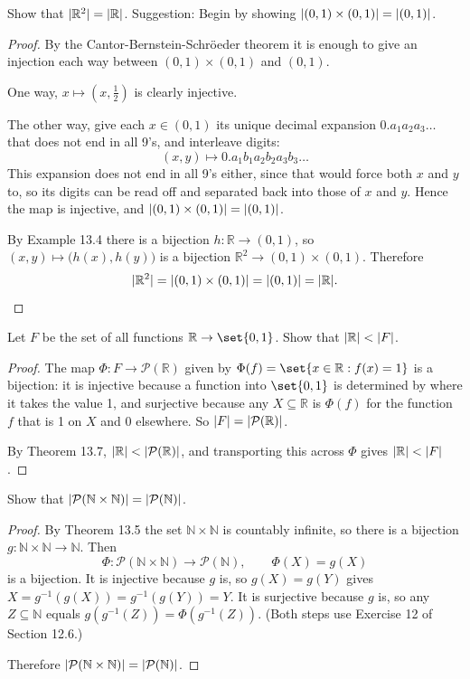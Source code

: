 \documentclass[DIN, pagenumber=false, fontsize=11pt, parskip=half]{scrartcl}
\begin{document}
\begin{problems}
    \problem Show that $\lvert \mathbb{R}^2 \rvert = \lvert \mathbb{R} \rvert$. Suggestion: Begin by showing $\lvert (0,1) \times (0,1) \rvert = \lvert (0,1) \rvert$.

    \begin{proof}
        By the Cantor-Bernstein-Schr\"oeder theorem it is enough to give an injection each way between $(0,1) \times (0,1)$ and $(0,1)$.

        One way, $x \mapsto \left(x, \frac{1}{2}\right)$ is clearly injective.

        The other way, give each $x \in (0,1)$ its unique decimal expansion $0.a_1a_2a_3\ldots$ that does not end in all 9's, and interleave digits:
        \[
            (x,y) \longmapsto 0.a_1b_1a_2b_2a_3b_3\ldots
        \]
        This expansion does not end in all 9's either, since that would force both $x$ and $y$ to, so its digits can be read off and separated back into those of $x$ and $y$. Hence the map is injective, and $\lvert (0,1) \times (0,1) \rvert = \lvert (0,1) \rvert$.

        By Example 13.4 there is a bijection $h : \mathbb{R} \to (0,1)$, so $(x,y) \mapsto \big(h(x),h(y)\big)$ is a bijection $\mathbb{R}^2 \to (0,1) \times (0,1)$. Therefore
        \[
            \lvert \mathbb{R}^2 \rvert = \lvert (0,1) \times (0,1) \rvert = \lvert (0,1) \rvert = \lvert \mathbb{R} \rvert. \qedhere
        \]
    \end{proof}

    \problem Let $F$ be the set of all functions $\mathbb{R} \to \set{0,1}$. Show that $\lvert \mathbb{R} \rvert < \lvert F \rvert$.

    \begin{proof}
        The map $\Phi : F \to \mathcal{P}(\mathbb{R})$ given by $\Phi(f) = \set{x \in \mathbb{R} : f(x) = 1}$ is a bijection: it is injective because a function into $\set{0,1}$ is determined by where it takes the value 1, and surjective because any $X \subseteq \mathbb{R}$ is $\Phi(f)$ for the function $f$ that is 1 on $X$ and 0 elsewhere. So $\lvert F \rvert = \lvert \mathcal{P}(\mathbb{R}) \rvert$.

        By Theorem 13.7, $\lvert \mathbb{R} \rvert < \lvert \mathcal{P}(\mathbb{R}) \rvert$, and transporting this across $\Phi$ gives $\lvert \mathbb{R} \rvert < \lvert F \rvert$.
    \end{proof}

    \problem Show that $\lvert \mathcal{P}(\mathbb{N} \times \mathbb{N}) \rvert = \lvert \mathcal{P}(\mathbb{N}) \rvert$.

    \begin{proof}
        By Theorem 13.5 the set $\mathbb{N} \times \mathbb{N}$ is countably infinite, so there is a bijection $g : \mathbb{N} \times \mathbb{N} \to \mathbb{N}$. Then
        \[
            \Phi : \mathcal{P}(\mathbb{N} \times \mathbb{N}) \to \mathcal{P}(\mathbb{N}), \qquad \Phi(X) = g(X)
        \]
        is a bijection. It is injective because $g$ is, so $g(X) = g(Y)$ gives $X = g^{-1}(g(X)) = g^{-1}(g(Y)) = Y$. It is surjective because $g$ is, so any $Z \subseteq \mathbb{N}$ equals $g(g^{-1}(Z)) = \Phi(g^{-1}(Z))$. (Both steps use Exercise 12 of Section 12.6.)

        Therefore $\lvert \mathcal{P}(\mathbb{N} \times \mathbb{N}) \rvert = \lvert \mathcal{P}(\mathbb{N}) \rvert$.
    \end{proof}
\end{problems}
\end{document}
